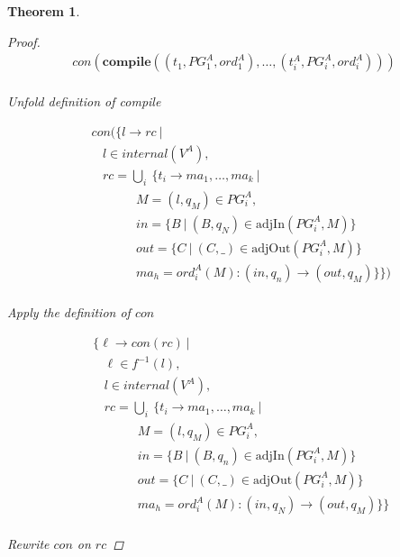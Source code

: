 \documentclass[twocolumn]{sig-alternate-10pt}
\newtheorem{thm}{Theorem}[section]
\begin{document}
\begin{thm}
\begin{proof}
  \[ \begin{array}{l}
     con(\textbf{compile}( (t_1,PG^A_1,ord^A_1), \dots, (t^A_i,PG^A_i,ord^A_i) )) \\
  \end{array} \]%

Unfold definition of compile

  \[ \begin{array}{l}
     ~~~~~ con(\{ l \rightarrow rc ~\vert~ \\
     ~~~~~~~~~ l \in internal(V^A), \\
     ~~~~~~~~~ rc = \bigcup_i~ \{ t_i \rightarrow ma_1, \dots, ma_k ~\vert~ \\
     ~~~~~~~~~~~~~~~~~~~~~ M = (l,q_M) \in PG^A_i, \\
     ~~~~~~~~~~~~~~~~~~~~~ in = \{ B ~\vert~ (B,q_N) \in \text{adjIn}(PG^A_i,M) \} \\
     ~~~~~~~~~~~~~~~~~~~~~ out = \{ C ~\vert~ (C,\_) \in \text{adjOut}(PG^A_i,M) \} \\
     ~~~~~~~~~~~~~~~~~~~~~ ma_h = ord^A_i(M) : (in,q_n) \rightarrow (out,q_M) \} \}) \\
  \end{array} \]%

  Apply the definition of $con$

  \[ \begin{array}{l}
     ~~~~~ \{ \ell \rightarrow con(rc) ~\vert~ \\
     ~~~~~~~~~ \ell \in f^{-1}(l), \\
     ~~~~~~~~~ l \in internal(V^A), \\
     ~~~~~~~~~ rc = \bigcup_i~ \{ t_i \rightarrow ma_1, \dots, ma_k ~\vert~ \\
     ~~~~~~~~~~~~~~~~~~~~~ M = (l,q_M) \in PG^A_i, \\
     ~~~~~~~~~~~~~~~~~~~~~ in = \{ B ~\vert~ (B,q_n) \in \text{adjIn}(PG^A_i,M) \} \\
     ~~~~~~~~~~~~~~~~~~~~~ out = \{ C ~\vert~ (C,\_) \in \text{adjOut}(PG^A_i,M) \} \\
     ~~~~~~~~~~~~~~~~~~~~~ ma_h = ord^A_i(M) : (in,q_N) \rightarrow (out,q_M) \} \} \\
  \end{array} \]%

  Rewrite $con$ on $rc$


\end{proof}
\end{thm}
\end{document}
